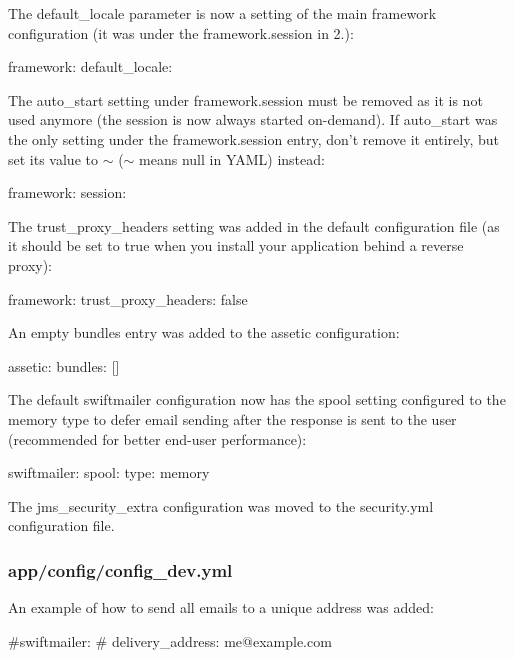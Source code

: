 The {\ttfamily default\+\_\+locale} parameter is now a setting of the main {\ttfamily framework} configuration (it was under the {\ttfamily framework.\+session} in 2.)\+: \begin{DoxyVerb}framework:
    default_locale: %
\end{DoxyVerb}


The {\ttfamily auto\+\_\+start} setting under {\ttfamily framework.\+session} must be removed as it is not used anymore (the session is now always started on-\/demand). If {\ttfamily auto\+\_\+start} was the only setting under the {\ttfamily framework.\+session} entry, don't remove it entirely, but set its value to {\ttfamily $\sim$} ({\ttfamily $\sim$} means {\ttfamily null} in Y\+A\+M\+L) instead\+: \begin{DoxyVerb}framework:
    session: ~
\end{DoxyVerb}


The {\ttfamily trust\+\_\+proxy\+\_\+headers} setting was added in the default configuration file (as it should be set to {\ttfamily true} when you install your application behind a reverse proxy)\+: \begin{DoxyVerb}framework:
    trust_proxy_headers: false
\end{DoxyVerb}


An empty {\ttfamily bundles} entry was added to the {\ttfamily assetic} configuration\+: \begin{DoxyVerb}assetic:
    bundles: []
\end{DoxyVerb}


The default {\ttfamily swiftmailer} configuration now has the {\ttfamily spool} setting configured to the {\ttfamily memory} type to defer email sending after the response is sent to the user (recommended for better end-\/user performance)\+: \begin{DoxyVerb}swiftmailer:
    spool: { type: memory }
\end{DoxyVerb}


The {\ttfamily jms\+\_\+security\+\_\+extra} configuration was moved to the {\ttfamily security.\+yml} configuration file.

\subsubsection*{{\ttfamily app/config/config\+\_\+dev.\+yml}}

An example of how to send all emails to a unique address was added\+: \begin{DoxyVerb}#swiftmailer:
#    delivery_address: me@example.com
\end{DoxyVerb}


